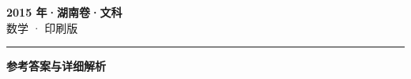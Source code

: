 \documentclass[zihao=5, a4paper]{ctexart}
\begin{document}
\begin{center}
  {\Large\bfseries 2015 年·湖南卷·文科}\\[4pt]
  {\large 数学 · 印刷版}
\end{center}
\medskip
{}

\par\bigskip\hrule\bigskip
{}
\begin{center}{\large\bfseries 参考答案与详细解析}\end{center}
\smallskip

\end{document}
